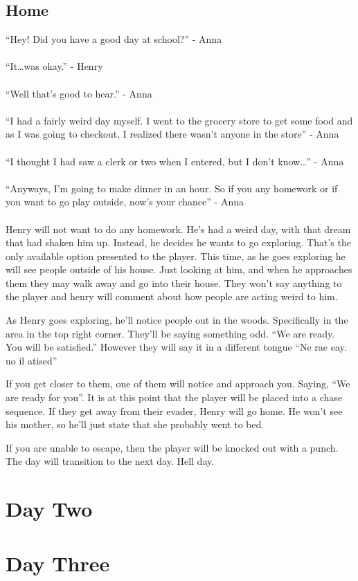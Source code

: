 \documentclass[12pt, a4paper, titlepage]{article}
\begin{document}
        \subsection{Home}

            ``Hey! Did you have a good day at school?'' - Anna\\~\\
            ``It\dots was okay.'' - Henry\\~\\
            ``Well that's good to hear.'' - Anna\\~\\
            ``I had a fairly weird day myself. I went to the grocery store to get some food and as I was going to checkout, I realized there wasn't anyone in the store'' - Anna\\~\\
            ``I thought I had saw a clerk or two when I entered, but I don't know\ldots'' - Anna\\~\\
            ``Anyways, I'm going to make dinner in an hour. So if you any homework or if you want to go play outside, now's your chance'' - Anna\\~\\

            Henry will not want to do any homework. He's had a weird day, with that dream that had shaken him up. Instead, he decides he wants to go exploring. That's the only available 		   option presented to the player. This time, as he goes exploring he will see people outside of his house. Just looking at him, and when he approaches them they may walk away 		   and go into their house. They won't say anything to the player and henry will comment about how people are acting weird to him.
            
            As Henry goes exploring, he'll notice people out in the woods. Specifically in the area in the top right corner. They'll be saying something odd. ``We are ready. You will be 			   satisfied.'' However they will say it in a different tongue ``Ne rae eay. uo il atised''
            
            If you get closer to them, one of them will notice and approach you. Saying, ``We are ready for you''. It is at this point that the player will be placed into a chase sequence. If they 
            get away from their evader, Henry will go home. He won't see his mother, so he'll just state that she probably went to bed.
            
            If you are unable to escape, then the player will be knocked out with a punch. The day will transition to the next day. Hell day.
            
    \section{Day Two}
    
    \section{Day Three}
\end{document}
